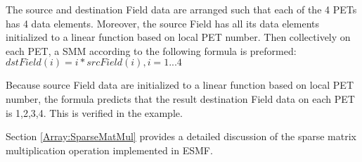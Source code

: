    The source and destination Field data are arranged such that each of the 4 PETs has 4
   data elements. Moreover, the source Field has all its data elements initialized to a linear
   function based on local PET number.
   Then collectively on each PET, a SMM according to the following formula
   is preformed: \newline
   $dstField(i) = i * srcField(i), i = 1 ... 4$ \newline
   \newline
  
   Because source Field data are initialized to a linear function based on local PET number,
   the formula predicts that
   the result destination Field data on each PET is {1,2,3,4}. This is verified in the
   example.
  
   Section \ref{Array:SparseMatMul} provides a detailed discussion of the
   sparse matrix multiplication operation implemented in ESMF.
   

